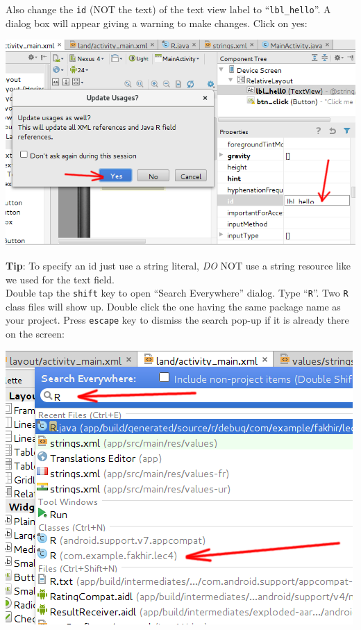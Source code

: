 Also change the \texttt{id} (NOT the text) of the text view label to ``\texttt{lbl\_hello}''. A dialog box will appear giving a warning to make changes. Click on yes:

\begin{center}
	\includegraphics[scale=0.4]{chapters/ch04/images/31}
\end{center}

\textbf{Tip}: To specify an id just use a string literal, \textit{DO} NOT use a string resource like we used for the text field. \\

Double tap the \texttt{shift} key to open ``Search Everywhere'' dialog. Type ``\texttt{R}''. Two \texttt{R} class files will show up. Double click the one having the same package name as your project. Press \texttt{escape} key to dismiss the search pop-up if it is already there on the screen:

\begin{center}
	\includegraphics[scale=0.4]{chapters/ch04/images/28}
\end{center}

